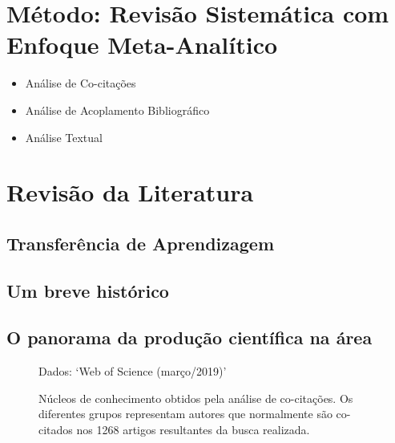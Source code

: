 \documentclass[sigconf]{acmart}
\newcommand{\source}[2]{\raggedleft{}\vspace*{-7mm}\caption*{ \scriptsize{{#1}: {`#2'}}}}
\begin{document}
\section{Método: Revisão Sistemática com Enfoque Meta-Analítico}
  \lipsum[1]
  \begin{itemize}
    \item{Análise de Co-citações}
    \item{Análise de Acoplamento Bibliográfico}
    \item{Análise Textual}
  \end{itemize}
\section{Revisão da Literatura}
  \subsection{Transferência de Aprendizagem}
  \lipsum[3]
  \subsection{Um breve histórico}
  \lipsum[2]
  \subsection{O panorama da produção científica na área}
  \lipsum[1]
    \begin{figure}[h]
    \source{Dados}{Web of Science (março/2019)}
    \caption{Núcleos de conhecimento obtidos pela análise de co-citações. Os diferentes grupos representam autores que normalmente são co-citados nos 1268 artigos resultantes da busca realizada.}
    \label{fig:classicos}
  \end{figure}
  
\end{document}
